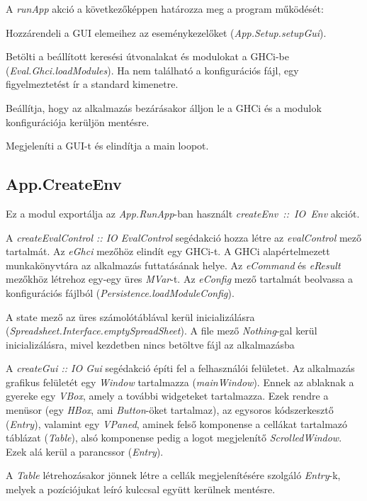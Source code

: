 A \textit{runApp} akció a következőképpen határozza meg a program működését:
\begin{compactenum}
	\item Hozzárendeli a GUI elemeihez az eseménykezelőket (\textit{App.Setup.setupGui}).
	\item Betölti a beállított keresési útvonalakat és modulokat a GHCi-be (\textit{Eval.Ghci.loadModules}). Ha nem található a konfigurációs fájl, egy figyelmeztetést ír a standard kimenetre.
	\item Beállítja, hogy az alkalmazás bezárásakor álljon le a GHCi és a modulok konfigurációja kerüljön mentésre.
	\item Megjeleníti a GUI-t és elindítja a main loopot. 
\end{compactenum}

\subsection{App.CreateEnv}

Ez a modul exportálja az \textit{App.RunApp}-ban használt \mbox{\textit{createEnv :: IO Env}} akciót.

A \textit{createEvalControl :: IO EvalControl} segédakció hozza létre az \textit{evalControl} mező tartalmát. Az \textit{eGhci} mezőhöz elindít egy GHCi-t. A GHCi alapértelmezett munkakönyvtára az alkalmazás futtatásának helye. Az \textit{eCommand} és \textit{eResult} mezőkhöz létrehoz egy-egy üres \textit{MVar}-t. Az \textit{eConfig} mező tartalmát beolvassa a konfigurációs fájlból (\textit{Persistence.loadModuleConfig}).

A state mező az üres számolótáblával kerül inicializálásra (\textit{Spreadsheet.Interface.emptySpreadSheet}). A file mező \textit{Nothing}-gal kerül inicializálásra, mivel kezdetben nincs betöltve fájl az alkalmazásba

A \textit{createGui :: IO Gui} segédakció építi fel a felhasználói felületet. Az alkalmazás grafikus felületét egy \textit{Window} tartalmazza (\textit{mainWindow}). Ennek az ablaknak a gyereke egy \textit{VBox}, amely a további widgeteket tartalmazza.   Ezek rendre a menüsor (egy \textit{HBox}, ami \textit{Button}-öket tartalmaz),  az egysoros kódszerkesztő (\textit{Entry}), valamint egy \textit{VPaned}, aminek felső komponense a cellákat tartalmazó táblázat (\textit{Table}), alsó komponense pedig a logot megjelenítő \textit{ScrolledWindow}. Ezek alá kerül a parancssor (\textit{Entry}).

A \textit{Table} létrehozásakor jönnek létre a cellák megjelenítésére szolgáló \textit{Entry}-k, melyek a pozíciójukat leíró kulccsal együtt kerülnek mentésre.

